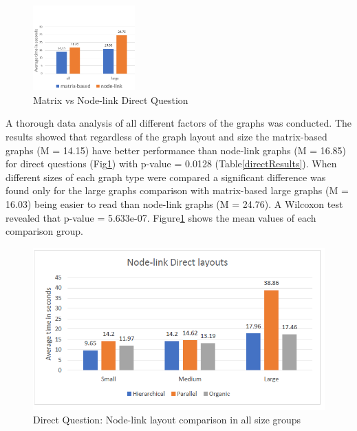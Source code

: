 \documentclass{l4proj}
\begin{document}
\begin{figure}
	\centering
	\vspace{-20mm}
    \includegraphics[width=0.35\textwidth]{images/directComparison.PNG}
    \caption{Matrix vs Node-link Direct Question} 
	\label{directComparison}
\end{figure}


A thorough data analysis of all different factors of the graphs was conducted. The results showed that regardless of the graph layout and size the matrix-based graphs (M = 14.15) have better performance than node-link graphs (M = 16.85) for direct questions (Fig\ref{directComparison}) with p-value = 0.0128 (Table\ref{directResults}). When different sizes of each graph type were compared a significant difference was found only for the large graphs comparison with matrix-based large graphs (M = 16.03) being easier to read than node-link graphs (M = 24.76). A Wilcoxon test revealed that p-value = 5.633e-07. Figure\ref{directComparison} shows the mean values of each comparison group. 

\bigskip
\begin{figure}[!ht]
    \includegraphics[width=13cm]{images/nodelinkdirectlayouts.PNG}
    \vspace{-15pt}
    \centering
    \caption{Direct Question: Node-link layout comparison in all size groups}
	\label{nodelinkdirectlayouts}
\end{figure}
\end{document}
